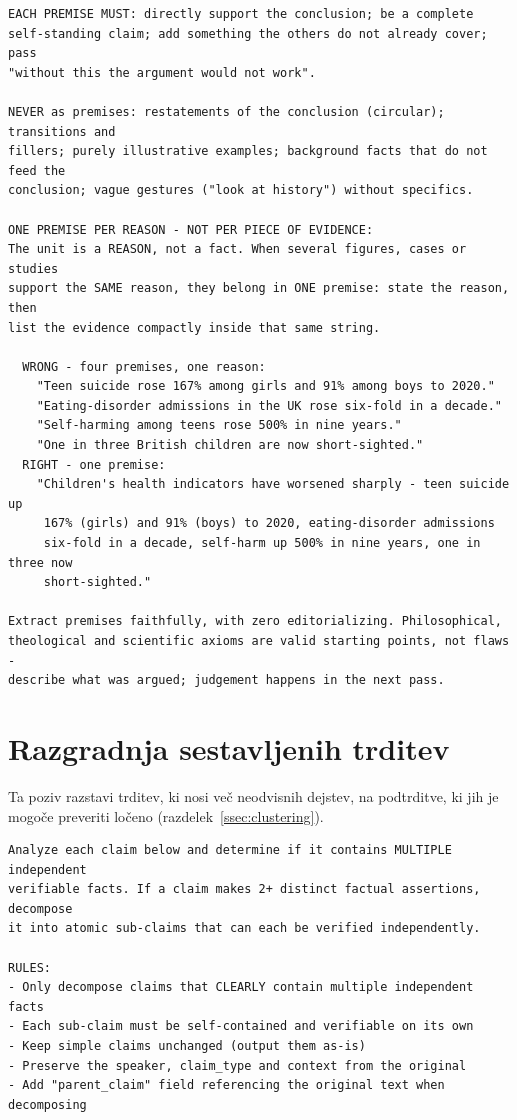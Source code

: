 \documentclass[a4paper, 12pt]{book}
\begin{document}
\begin{lstlisting}[basicstyle=\ttfamily\scriptsize,breaklines=true]
EACH PREMISE MUST: directly support the conclusion; be a complete
self-standing claim; add something the others do not already cover; pass
"without this the argument would not work".

NEVER as premises: restatements of the conclusion (circular); transitions and
fillers; purely illustrative examples; background facts that do not feed the
conclusion; vague gestures ("look at history") without specifics.

ONE PREMISE PER REASON - NOT PER PIECE OF EVIDENCE:
The unit is a REASON, not a fact. When several figures, cases or studies
support the SAME reason, they belong in ONE premise: state the reason, then
list the evidence compactly inside that same string.

  WRONG - four premises, one reason:
    "Teen suicide rose 167% among girls and 91% among boys to 2020."
    "Eating-disorder admissions in the UK rose six-fold in a decade."
    "Self-harming among teens rose 500% in nine years."
    "One in three British children are now short-sighted."
  RIGHT - one premise:
    "Children's health indicators have worsened sharply - teen suicide up
     167% (girls) and 91% (boys) to 2020, eating-disorder admissions
     six-fold in a decade, self-harm up 500% in nine years, one in three now
     short-sighted."

Extract premises faithfully, with zero editorializing. Philosophical,
theological and scientific axioms are valid starting points, not flaws -
describe what was argued; judgement happens in the next pass.
\end{lstlisting}

\section{Razgradnja sestavljenih trditev}
\label{app:poziv-razgradnja}

Ta poziv razstavi trditev, ki nosi več neodvisnih dejstev, na podtrditve, ki
jih je mogoče preveriti ločeno (razdelek~\ref{ssec:clustering}).

\begin{lstlisting}[basicstyle=\ttfamily\scriptsize,breaklines=true]
Analyze each claim below and determine if it contains MULTIPLE independent
verifiable facts. If a claim makes 2+ distinct factual assertions, decompose
it into atomic sub-claims that can each be verified independently.

RULES:
- Only decompose claims that CLEARLY contain multiple independent facts
- Each sub-claim must be self-contained and verifiable on its own
- Keep simple claims unchanged (output them as-is)
- Preserve the speaker, claim_type and context from the original
- Add "parent_claim" field referencing the original text when decomposing
\end{lstlisting}
\end{document}
